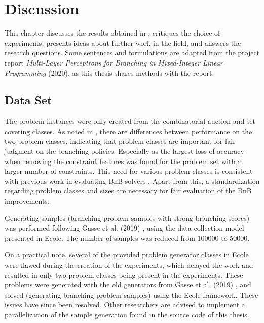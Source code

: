 \chapter{Discussion}\label{cha:discussion}

This chapter discusses the results obtained in , critiques the choice of experiments, presents ideas about further work in the field, and answers the research questions. Some sentences and formulations are adapted from the project report \textit{Multi-Layer Perceptrons for Branching in Mixed-Integer Linear Programming} (2020), as this thesis shares methods with the report. 
 

\section{Data Set}\label{sec:dis_data}

The problem instances were only created from the combinatorial auction and set covering classes. As noted in , there are differences between performance on the two problem classes, indicating that problem classes are important for fair judgment on the branching policies. Especially as the largest loss of accuracy when removing the constraint features was found for the problem set with a larger number of constraints. This need for various problem classes is consistent with previous work in evaluating \gls{BnB} solvers \cite{anand2017comparative}. Apart from this, a standardization regarding problem classes and sizes are necessary for fair evaluation of the \gls{BnB} improvements.

Generating samples (branching problem samples with strong branching scores) was performed following Gasse et al. (2019) \cite{gasse2019exact}, using the data collection model presented in \gls{Ecole}. The number of samples was reduced from $100000$ to $50000$. 

On a practical note, several of the provided problem generator classes in \gls{Ecole} were flawed during the creation of the experiments, which delayed the work and resulted in only two problem classes being present in the experiments. These problems were generated with the old generators from Gasse et al. (2019) \cite{gasse2019exact}, and solved (generating branching problem samples) using the \gls{Ecole} framework. These issues have since been resolved. Other researchers are advised to implement a parallelization of the sample generation found in the source code of this thesis. 

